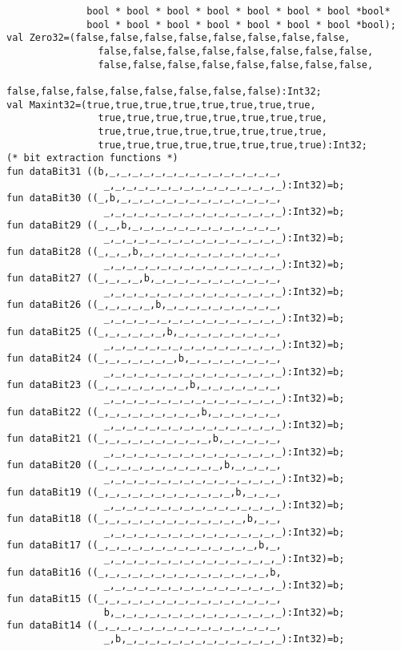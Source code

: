 \begin{verbatim}
              bool * bool * bool * bool * bool * bool * bool *bool*
              bool * bool * bool * bool * bool * bool * bool *bool);
val Zero32=(false,false,false,false,false,false,false,false,
                false,false,false,false,false,false,false,false,
                false,false,false,false,false,false,false,false,
                false,false,false,false,false,false,false,false):Int32;
val Maxint32=(true,true,true,true,true,true,true,true,
                true,true,true,true,true,true,true,true,
                true,true,true,true,true,true,true,true,
                true,true,true,true,true,true,true,true):Int32;
(* bit extraction functions *)
fun dataBit31 ((b,_,_,_,_,_,_,_,_,_,_,_,_,_,_,_,
                 _,_,_,_,_,_,_,_,_,_,_,_,_,_,_,_):Int32)=b;
fun dataBit30 ((_,b,_,_,_,_,_,_,_,_,_,_,_,_,_,_,
                 _,_,_,_,_,_,_,_,_,_,_,_,_,_,_,_):Int32)=b;
fun dataBit29 ((_,_,b,_,_,_,_,_,_,_,_,_,_,_,_,_,
                 _,_,_,_,_,_,_,_,_,_,_,_,_,_,_,_):Int32)=b;
fun dataBit28 ((_,_,_,b,_,_,_,_,_,_,_,_,_,_,_,_,
                 _,_,_,_,_,_,_,_,_,_,_,_,_,_,_,_):Int32)=b;
fun dataBit27 ((_,_,_,_,b,_,_,_,_,_,_,_,_,_,_,_,
                 _,_,_,_,_,_,_,_,_,_,_,_,_,_,_,_):Int32)=b;
fun dataBit26 ((_,_,_,_,_,b,_,_,_,_,_,_,_,_,_,_,
                 _,_,_,_,_,_,_,_,_,_,_,_,_,_,_,_):Int32)=b;
fun dataBit25 ((_,_,_,_,_,_,b,_,_,_,_,_,_,_,_,_,
                 _,_,_,_,_,_,_,_,_,_,_,_,_,_,_,_):Int32)=b;
fun dataBit24 ((_,_,_,_,_,_,_,b,_,_,_,_,_,_,_,_,
                 _,_,_,_,_,_,_,_,_,_,_,_,_,_,_,_):Int32)=b;
fun dataBit23 ((_,_,_,_,_,_,_,_,b,_,_,_,_,_,_,_,
                 _,_,_,_,_,_,_,_,_,_,_,_,_,_,_,_):Int32)=b;
fun dataBit22 ((_,_,_,_,_,_,_,_,_,b,_,_,_,_,_,_,
                 _,_,_,_,_,_,_,_,_,_,_,_,_,_,_,_):Int32)=b;
fun dataBit21 ((_,_,_,_,_,_,_,_,_,_,b,_,_,_,_,_,
                 _,_,_,_,_,_,_,_,_,_,_,_,_,_,_,_):Int32)=b;
fun dataBit20 ((_,_,_,_,_,_,_,_,_,_,_,b,_,_,_,_,
                 _,_,_,_,_,_,_,_,_,_,_,_,_,_,_,_):Int32)=b;
fun dataBit19 ((_,_,_,_,_,_,_,_,_,_,_,_,b,_,_,_,
                 _,_,_,_,_,_,_,_,_,_,_,_,_,_,_,_):Int32)=b;
fun dataBit18 ((_,_,_,_,_,_,_,_,_,_,_,_,_,b,_,_,
                 _,_,_,_,_,_,_,_,_,_,_,_,_,_,_,_):Int32)=b;
fun dataBit17 ((_,_,_,_,_,_,_,_,_,_,_,_,_,_,b,_,
                 _,_,_,_,_,_,_,_,_,_,_,_,_,_,_,_):Int32)=b;
fun dataBit16 ((_,_,_,_,_,_,_,_,_,_,_,_,_,_,_,b,
                 _,_,_,_,_,_,_,_,_,_,_,_,_,_,_,_):Int32)=b;
fun dataBit15 ((_,_,_,_,_,_,_,_,_,_,_,_,_,_,_,_,
                 b,_,_,_,_,_,_,_,_,_,_,_,_,_,_,_):Int32)=b;
fun dataBit14 ((_,_,_,_,_,_,_,_,_,_,_,_,_,_,_,_,
                 _,b,_,_,_,_,_,_,_,_,_,_,_,_,_,_):Int32)=b;

\end{verbatim}
